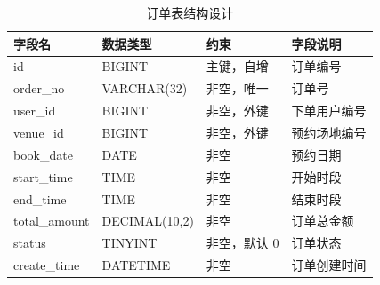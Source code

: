 \begin{table}[htbp]
\centering
\caption{订单表结构设计}
\label{tab:order-table}
\small
\begin{tabularx}{\textwidth}{p{2.2cm}p{2.7cm}p{2.4cm}X}
\toprule
字段名 & 数据类型 & 约束 & 字段说明 \\
\midrule
id & BIGINT & 主键，自增 & 订单编号 \\
order\_no & VARCHAR(32) & 非空，唯一 & 订单号 \\
user\_id & BIGINT & 非空，外键 & 下单用户编号 \\
venue\_id & BIGINT & 非空，外键 & 预约场地编号 \\
book\_date & DATE & 非空 & 预约日期 \\
start\_time & TIME & 非空 & 开始时段 \\
end\_time & TIME & 非空 & 结束时段 \\
total\_amount & DECIMAL(10,2) & 非空 & 订单总金额 \\
status & TINYINT & 非空，默认 0 & 订单状态 \\
create\_time & DATETIME & 非空 & 订单创建时间 \\
\bottomrule
\end{tabularx}
\end{table}

